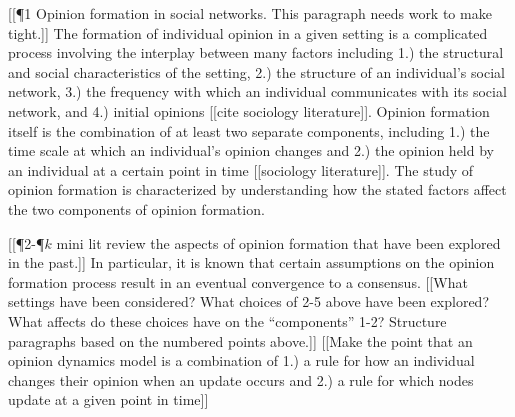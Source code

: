 \documentclass{amsart}
\theoremstyle{remark}
\begin{document}
[[\P1 Opinion formation in social networks.  This paragraph needs work to make tight.]] The formation of individual opinion in a given setting is a complicated process involving the interplay between many factors including 1.) the structural and social characteristics of the setting, 2.) the structure of an individual's social network, 3.) the frequency with which an individual communicates with its social network, and 4.) initial opinions [[cite sociology literature]].  Opinion formation itself is the combination of at least two separate components, including 1.) the time scale at which an individual's opinion changes and 2.) the opinion held by an individual at a certain point in time [[sociology literature]]. The study of opinion formation is characterized by understanding how the stated factors affect the two components of opinion formation.

[[\P2-\P$k$ mini lit review  the aspects of opinion formation that have been explored in the past.]] In particular, it is known that certain assumptions on the opinion formation process result in an eventual convergence to a consensus. [[What settings have been considered? What choices of 2-5 above have been explored? What affects do these choices have on the ``components'' 1-2? Structure paragraphs based on the numbered points above.]] [[Make the point that an opinion dynamics model is a combination of 1.) a rule for how an individual changes their opinion when an update occurs and 2.) a rule for which nodes update at a given point in time]] 
\end{document}
